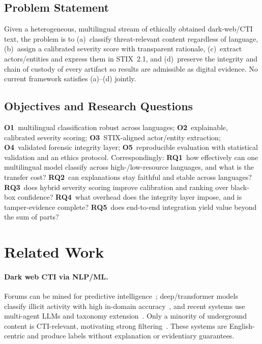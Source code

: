 \documentclass[11pt,a4paper]{article}
\begin{document}
\subsection{Problem Statement}
Given a heterogeneous, multilingual stream of ethically obtained dark-web/CTI text, the
problem is to (a)~classify threat-relevant content regardless of language, (b)~assign a
calibrated severity score with transparent rationale, (c)~extract actors/entities and
express them in STIX~2.1, and (d)~preserve the integrity and chain of custody of every
artifact so results are admissible as digital evidence. No current framework satisfies
(a)--(d) jointly.

\subsection{Objectives and Research Questions}
\textbf{O1}~multilingual classification robust across languages; \textbf{O2}~explainable,
calibrated severity scoring; \textbf{O3}~STIX-aligned actor/entity extraction;
\textbf{O4}~validated forensic integrity layer; \textbf{O5}~reproducible evaluation with
statistical validation and an ethics protocol. Correspondingly:
\textbf{RQ1}~how effectively can one multilingual model classify across high-/low-resource
languages, and what is the transfer cost? \textbf{RQ2}~can explanations stay faithful and
stable across languages? \textbf{RQ3}~does hybrid severity scoring improve calibration and
ranking over black-box confidence? \textbf{RQ4}~what overhead does the integrity layer
impose, and is tamper-evidence complete? \textbf{RQ5}~does end-to-end integration yield
value beyond the sum of parts?

\section{Related Work}\label{sec:related}

\paragraph{Dark web CTI via NLP/ML.} Forums can be mined for predictive
intelligence~\cite{kadoguchi2019exploring}; deep/transformer models classify illicit
activity with high in-domain accuracy~\cite{sangher2023towards,sangher2024lstm}, and
recent systems use multi-agent LLMs and taxonomy
extension~\cite{shah2025madcti,demarcos2026llm,pasupuleti2025threat}. Only a minority of
underground content is CTI-relevant, motivating strong
filtering~\cite{schroer2025darkside}. These systems are English-centric and produce labels
without explanation or evidentiary guarantees.
\end{document}
